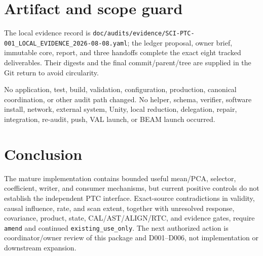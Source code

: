 \documentclass[11pt]{article}
\newcommand{\code}[1]{\nolinkurl{#1}}
\begin{document}
\section{Artifact and scope guard}

The local evidence record is
\code{doc/audits/evidence/SCI-PTC-001_LOCAL_EVIDENCE_2026-08-08.yaml}; the
ledger proposal, owner brief, immutable core, report, and three handoffs
complete the exact eight tracked deliverables.  Their digests and the final
commit/parent/tree are supplied in the Git return to avoid circularity.

No application, test, build, validation, configuration, production, canonical
coordination, or other audit path changed.  No helper, schema, verifier,
software install, network, external system, Unity, local reduction,
delegation, repair, integration, re-audit, push, VAL launch, or BEAM launch
occurred.

\section{Conclusion}

The mature implementation contains bounded useful mean/PCA, selector,
coefficient, writer, and consumer mechanisms, but current positive controls do
not establish the independent PTC interface.  Exact-source contradictions in
validity, causal influence, rate, and scan extent, together with unresolved
response, covariance, product, state, CAL/AST/ALIGN/RTC, and evidence gates,
require \texttt{amend} and continued \texttt{existing\_use\_only}.  The next
authorized action is coordinator/owner review of this package and D001--D006,
not implementation or downstream expansion.
\end{document}
